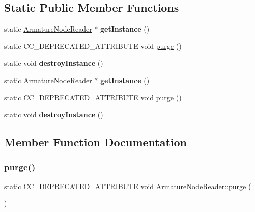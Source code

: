 \subsection*{Static Public Member Functions}
\begin{DoxyCompactItemize}
\item 
\mbox{\label{classArmatureNodeReader_ab84c6c51afb96e48b1c4c6ba123d1909}} 
static \hyperlink{classArmatureNodeReader}{Armature\+Node\+Reader} $\ast$ {\bfseries get\+Instance} ()
\item 
static C\+C\+\_\+\+D\+E\+P\+R\+E\+C\+A\+T\+E\+D\+\_\+\+A\+T\+T\+R\+I\+B\+U\+TE void \hyperlink{classArmatureNodeReader_a9cb29fa475333529d6b91f75f7ef0b41}{purge} ()
\item 
\mbox{\label{classArmatureNodeReader_a6cbfe5e2fb909033f8fd3aa52b25fe8c}} 
static void {\bfseries destroy\+Instance} ()
\item 
\mbox{\label{classArmatureNodeReader_a56cc5dc39c751ebcf6a707b8bebac5af}} 
static \hyperlink{classArmatureNodeReader}{Armature\+Node\+Reader} $\ast$ {\bfseries get\+Instance} ()
\item 
static C\+C\+\_\+\+D\+E\+P\+R\+E\+C\+A\+T\+E\+D\+\_\+\+A\+T\+T\+R\+I\+B\+U\+TE void \hyperlink{classArmatureNodeReader_a9cb29fa475333529d6b91f75f7ef0b41}{purge} ()
\item 
\mbox{\label{classArmatureNodeReader_aabcf090af24569c147d6b4f32b05d42b}} 
static void {\bfseries destroy\+Instance} ()
\end{DoxyCompactItemize}


\subsection{Member Function Documentation}
\mbox{\label{classArmatureNodeReader_a9cb29fa475333529d6b91f75f7ef0b41}} 
\subsubsection{\texorpdfstring{purge()}{purge()}\hspace{0.1cm}{\footnotesize\ttfamily [1/2]}}
{\footnotesize\ttfamily static C\+C\+\_\+\+D\+E\+P\+R\+E\+C\+A\+T\+E\+D\+\_\+\+A\+T\+T\+R\+I\+B\+U\+TE void Armature\+Node\+Reader\+::purge (\begin{DoxyParamCaption}{ }\end{DoxyParamCaption})\hspace{0.3cm}{\ttfamily [static]}}

